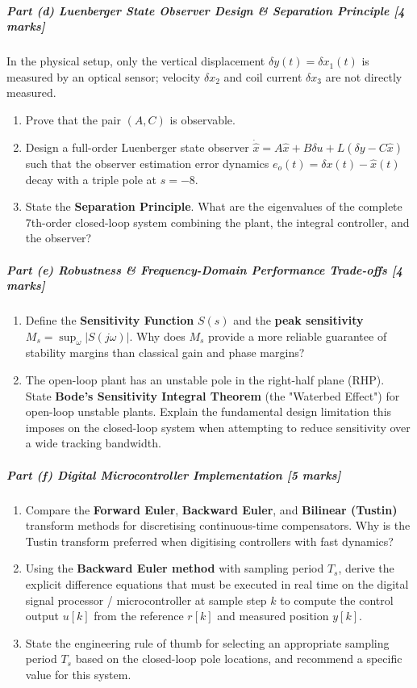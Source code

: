 \documentclass[12pt,onecolumn,twoside ]{article}
\begin{document}
	\subparagraph{\textbf{Part (d) Luenberger State Observer Design \& Separation Principle [4 marks]}}
	In the physical setup, only the vertical displacement $\delta y(t) = \delta x_1(t)$ is measured by an optical sensor; velocity $\delta x_2$ and coil current $\delta x_3$ are not directly measured.
	\begin{enumerate}
		\item
		Prove that the pair $(A, C)$ is observable.
		\item
		Design a full-order Luenberger state observer $\dot{\hat{x}} = A \hat{x} + B \delta u + L(\delta y - C \hat{x})$ such that the observer estimation error dynamics $e_o(t) = \delta x(t) - \hat{x}(t)$ decay with a triple pole at $s = -8$.
		\item
		State the \textbf{Separation Principle}. What are the eigenvalues of the complete 7th-order closed-loop system combining the plant, the integral controller, and the observer?
	\end{enumerate}
	\subparagraph{\textbf{Part (e) Robustness \& Frequency-Domain Performance Trade-offs [4 marks]}}
	\begin{enumerate}
		\item
		Define the \textbf{Sensitivity Function} $S(s)$ and the \textbf{peak sensitivity} $M_s = \sup_{\omega} |S(j\omega)|$. Why does $M_s$ provide a more reliable guarantee of stability margins than classical gain and phase margins?
		\item
		The open-loop plant has an unstable pole in the right-half plane (RHP). State \textbf{Bode's Sensitivity Integral Theorem} (the "Waterbed Effect") for open-loop unstable plants. Explain the fundamental design limitation this imposes on the closed-loop system when attempting to reduce sensitivity over a wide tracking bandwidth.
	\end{enumerate}
	\subparagraph{\textbf{Part (f) Digital Microcontroller Implementation [5 marks]}}
	\begin{enumerate}
		\item
		Compare the \textbf{Forward Euler}, \textbf{Backward Euler}, and \textbf{Bilinear (Tustin)} transform methods for discretising continuous-time compensators. Why is the Tustin transform preferred when digitising controllers with fast dynamics?
		\item
		Using the \textbf{Backward Euler method} with sampling period $T_s$, derive the explicit difference equations that must be executed in real time on the digital signal processor / microcontroller at sample step $k$ to compute the control output $u[k]$ from the reference $r[k]$ and measured position $y[k]$.
		\item
		State the engineering rule of thumb for selecting an appropriate sampling period $T_s$ based on the closed-loop pole locations, and recommend a specific value for this system.
	\end{enumerate}
	
\end{document}
